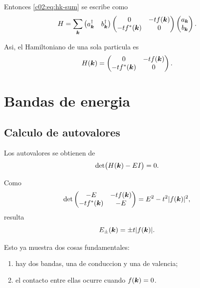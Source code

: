 Entonces \eqref{c02:eq:hk-sum} se escribe como
\begin{equation}
H = \sum_{\bm{k}}
\begin{pmatrix}
a_{\bm{k}}^\dagger & b_{\bm{k}}^\dagger
\end{pmatrix}
\begin{pmatrix}
0 & -t f(\bm{k})\\
-t f^*(\bm{k}) & 0
\end{pmatrix}
\begin{pmatrix}
a_{\bm{k}}\\
b_{\bm{k}}
\end{pmatrix}.
\label{c02:eq:bloch-matrix}
\end{equation}

Asi, el Hamiltoniano de una sola particula es
\begin{equation}
H(\bm{k})=
\begin{pmatrix}
0 & -t f(\bm{k})\\
-t f^*(\bm{k}) & 0
\end{pmatrix}.
\label{c02:eq:Hk}
\end{equation}

\section{Bandas de energia}

\subsection{Calculo de autovalores}

Los autovalores se obtienen de
\begin{equation}
\det\!\big(H(\bm{k})-E I\big)=0.
\end{equation}

Como
\begin{equation}
\det
\begin{pmatrix}
-E & -t f(\bm{k})\\
-t f^*(\bm{k}) & -E
\end{pmatrix}
= E^2 - t^2 |f(\bm{k})|^2,
\end{equation}
resulta
\begin{equation}
E_\pm(\bm{k})=\pm t |f(\bm{k})|.
\label{c02:eq:dispersion-general}
\end{equation}

Esto ya muestra dos cosas fundamentales:

\begin{enumerate}[leftmargin=*]
  \item hay dos bandas, una de conduccion y una de valencia;
  \item el contacto entre ellas ocurre cuando \(f(\bm{k})=0\).
\end{enumerate}

